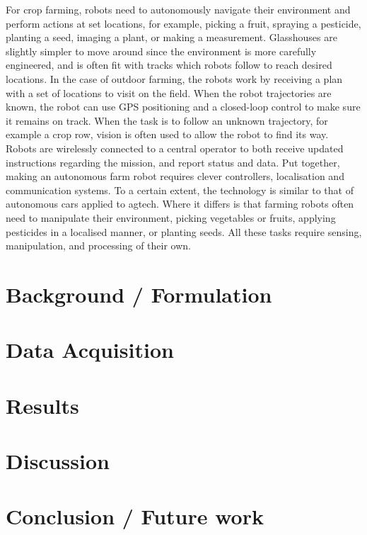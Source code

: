 \documentclass[10pt,journal,compsoc]{IEEEtran}
\begin{document}
For crop farming, robots need to autonomously navigate their environment and perform actions at set locations, for example, picking a fruit, spraying a pesticide, planting a seed, imaging a plant, or making a measurement. Glasshouses are slightly simpler to move around since the environment is more carefully engineered, and is often fit with tracks which robots follow to reach desired locations. In the case of outdoor farming, the robots work by receiving a plan with a set of locations to visit on the field. When the robot trajectories are known, the robot can use GPS positioning and a closed-loop control to make sure it remains on track. When the task is to follow an unknown trajectory, for example a crop row, vision is often used to allow the robot to find its way. Robots are wirelessly connected to a central operator to both receive updated instructions regarding the mission, and report status and data. Put together, making an autonomous farm robot requires clever controllers, localisation and communication systems. To a certain extent, the technology is similar to that of autonomous cars applied to agtech. Where it differs is that farming robots often need to manipulate their environment, picking vegetables or fruits, applying pesticides in a localised manner, or planting seeds. All these tasks require sensing, manipulation, and processing of their own. 

\section{Background / Formulation}

\section{Data Acquisition}

\section{Results}

\section{Discussion}

\section{Conclusion / Future work}



\end{document}
